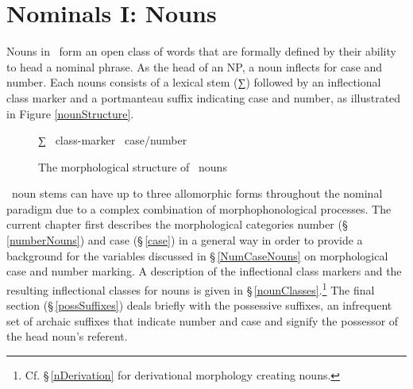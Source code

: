 


\chapter{Nominals I: Nouns}\label{nouns}
Nouns in \PS\ form an open class of words that are formally defined %
by their ability to head a nominal phrase. As the head of an NP, a noun inflects for case and number. 
Each nouns consists of a lexical stem (∑) followed by an inflectional class marker and a portmanteau suffix indicating case and number, as illustrated in Figure \vref{nounStructure}.
\begin{figure}[h]\centering
∑ \PLUS\ class-marker \PLUS\ case/number%
\caption{The morphological structure of \PS\ nouns}\label{nounStructure}
\end{figure}

\PS\ noun stems can have up to three allomorphic forms throughout the nominal paradigm due to a complex combination of morphophonological processes. 
The current chapter first describes the morphological categories number (§\,\ref{numberNouns}) and case (§\,\ref{case}) in a general way in order to provide a background for the variables discussed in §\,\ref{NumCaseNouns} on morphological case and number marking. %
A description of the inflectional class markers and the resulting inflectional classes for nouns is given in §\,\ref{nounClasses}.\footnote{Cf. §\,\ref{nDerivation} for derivational morphology creating nouns.} %
The final section (§\,\ref{possSuffixes}) deals briefly with the possessive suffixes, an infrequent set of archaic suffixes that indicate number and case and signify the possessor of the head noun’s referent. %

